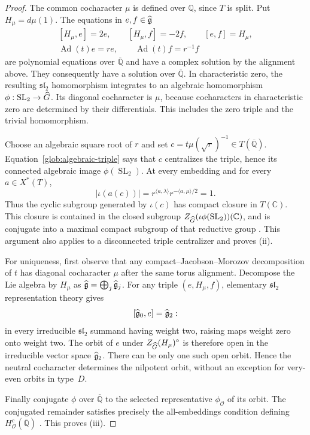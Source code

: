 \begin{proof}
The common cocharacter $\mu$ is defined over $\mathbb Q$, since $T$
is split.  Put $H_\mu=d\mu(1)$.  The equations in $e,f\in\widehat{\mathfrak g}$
\begin{equation}\label{glob:algebraic-triple}
 \begin{gathered}
 [H_\mu,e]=2e,\qquad [H_\mu,f]=-2f,\qquad [e,f]=H_\mu,\\
 \operatorname{Ad}(t)e=re,\qquad
 \operatorname{Ad}(t)f=r^{-1}f
 \end{gathered}
\end{equation}
are polynomial equations over $\overline{\mathbb Q}$ and have a
complex solution by the alignment above.  They consequently have a
solution over $\overline{\mathbb Q}$.  In characteristic zero, the
resulting $\mathfrak{sl}_2$ homomorphism integrates to an algebraic
homomorphism $\phi:\operatorname{SL}_2\to\widehat G$.  Its diagonal
cocharacter is $\mu$, because cocharacters in characteristic zero
are determined by their differentials.  This includes the zero
triple and the trivial homomorphism.

Choose an algebraic square root of $r$ and set
$c=t\mu(\sqrt r)^{-1}\in T(\overline{\mathbb Q})$.
Equation~\eqref{glob:algebraic-triple} says that $c$ centralizes the
triple, hence its connected algebraic image
$\phi(\operatorname{SL}_2)$.  At every embedding and for every
$a\in X^*(T)$,
\[
 |\iota(a(c))|
   =r^{\langle a,\lambda\rangle}
       r^{-\langle a,\mu\rangle/2}=1.
\]
Thus the cyclic subgroup generated by $\iota(c)$ has compact closure
in $T(\mathbb C)$.  This closure is contained in the closed subgroup
$Z_{\widehat G}(\iota\phi(\operatorname{SL}_2))(\mathbb C)$, and is
conjugate into a maximal compact subgroup of that reductive group
\cite[Theorems~3.6 and~3.7]{AdamsTaibiCohomology}.
This argument also applies to a disconnected triple centralizer and
proves \textup{(ii)}.

For uniqueness, first observe that any compact--Jacobson--Morozov
decomposition of $t$ has diagonal cocharacter $\mu$ after the same
torus alignment.  Decompose the Lie algebra by $H_\mu$ as
$\widehat{\mathfrak g}=\bigoplus_j\widehat{\mathfrak g}_j$.  For any triple $(e,H_\mu,f)$,
elementary $\mathfrak{sl}_2$ representation theory gives
\[
                  [\widehat{\mathfrak g}_0,e]=\widehat{\mathfrak g}_2:
\]
in every irreducible $\mathfrak{sl}_2$ summand having weight two,
raising maps weight zero onto weight two.  The orbit of $e$ under
$Z_{\widehat G}(H_\mu)^\circ$ is therefore open in the irreducible vector
space $\widehat{\mathfrak g}_2$.  There can be only one such open orbit.  Hence the
neutral cocharacter determines the nilpotent orbit, without an
exception for very-even orbits in type~$D$.

Finally conjugate $\phi$ over $\overline{\mathbb Q}$ to the selected
representative $\phi_{\mathcal O}$ of its orbit.  The conjugated
remainder satisfies precisely the all-embeddings condition defining
$H_{\mathcal O}^c(\overline{\mathbb Q})$
\cite[Sections~3.1.1 and~3.4.1--3.4.2]{GLR}.  This proves
\textup{(iii)}.
\end{proof}

